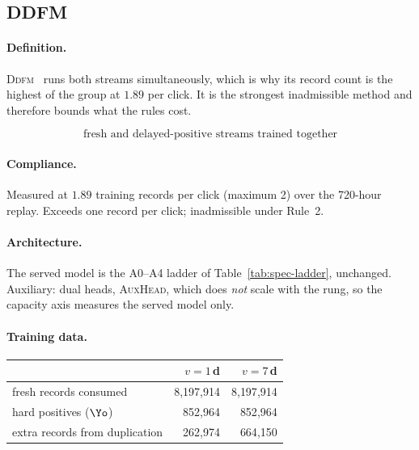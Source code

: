 \subsection{\textsc{DDFM}}\label{app:m-DDFM}

\paragraph{Definition.} \textsc{Ddfm}~\cite{dai2023dually} runs both streams simultaneously, which is why its
   record count is the highest of the group at $1.89$ per click. It is the strongest inadmissible
   method and therefore bounds what the rules cost.

\begin{equation}
\text{fresh and delayed-positive streams trained together}
\end{equation}

\begin{center}\end{center}

\paragraph{Compliance.} Measured at $1.89$ training records per click (maximum 2) over the 720-hour replay. Exceeds one record per click; inadmissible under Rule~2.

\paragraph{Architecture.} The served model is the A0--A4 ladder of Table~\ref{tab:spec-ladder}, unchanged. Auxiliary: dual heads, \textsc{AuxHead}, which does \emph{not} scale with the rung, so the capacity axis measures the served model only.

\paragraph{Training data.}
\begin{center}\small\begin{tabular}{lrr}
\toprule
 & $v=1$\,d & $v=7$\,d\\
\midrule
fresh records consumed & 8{,}197{,}914 & 8{,}197{,}914\\
hard positives ($\Yo$) & 852{,}964 & 852{,}964\\
extra records from duplication & 262{,}974 & 664{,}150\\
\bottomrule
\end{tabular}\end{center}


